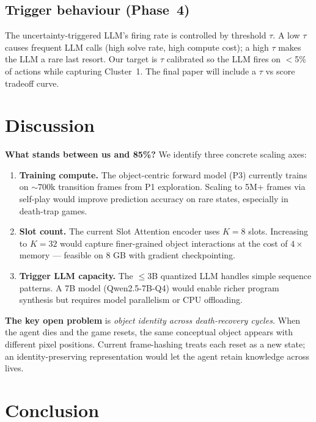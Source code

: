 \documentclass[10pt,letterpaper]{article}
\begin{document}
\subsection{Trigger behaviour (Phase~4)}

The uncertainty-triggered LLM's firing rate is controlled by threshold $\tau$.
A low $\tau$ causes frequent LLM calls (high solve rate, high compute cost);
a high $\tau$ makes the LLM a rare last resort.
Our target is $\tau$ calibrated so the LLM fires on $<$5\% of actions while capturing Cluster~1.
The final paper will include a $\tau$ vs score tradeoff curve.

\section{Discussion}\label{sec:discuss}

\textbf{What stands between us and 85\%?}
We identify three concrete scaling axes:

\begin{enumerate}
    \item \textbf{Training compute.} The object-centric forward model (P3) currently trains on $\sim$700k transition frames from P1 exploration. Scaling to 5M+ frames via self-play would improve prediction accuracy on rare states, especially in death-trap games.
    \item \textbf{Slot count.} The current Slot Attention encoder uses $K=8$ slots. Increasing to $K=32$ would capture finer-grained object interactions at the cost of $4\times$ memory — feasible on 8 GB with gradient checkpointing.
    \item \textbf{Trigger LLM capacity.} The $\leq$3B quantized LLM handles simple sequence patterns. A 7B model (Qwen2.5-7B-Q4) would enable richer program synthesis but requires model parallelism or CPU offloading.
\end{enumerate}

\textbf{The key open problem} is \textit{object identity across death-recovery cycles.}
When the agent dies and the game resets, the same conceptual object appears with different pixel positions.
Current frame-hashing treats each reset as a new state; an identity-preserving representation would let the agent retain knowledge across lives.

\section{Conclusion}\label{sec:conclusion}
\end{document}
